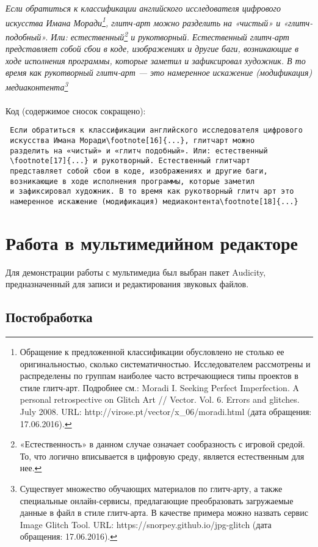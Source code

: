 \documentclass[a4paper]{article}
\begin{document}
\emph{Если обратиться к классификации английского исследователя цифрового искусства Имана Моради\footnote[16]{Обращение к предложенной классификации обусловлено не столько ее оригинальностью, сколько систематичностью. Исследователем рассмотрены и распределены по группам наиболее часто встречающиеся типы проектов в стиле глитч-арт. Подробнее см.: Moradi I. Seeking Perfect Imperfection. A personal retrospective on Glitch Art // Vector. Vol. 6. Errors and glitches. July 2008. URL: http://virose.pt/vector/x\_06/moradi.html (дата обращения: 17.06.2016).}, глитч-арт можно разделить на «чистый» и «глитч-подобный». Или: естественный\footnote[17]{«Естественность» в данном случае означает сообразность с игровой средой. То, что логично вписывается в цифровую среду, является естественным для нее.} и рукотворный. Естественный глитч-арт представляет собой сбои в коде, изображениях и другие баги, возникающие в ходе исполнения программы, которые заметил и зафиксировал художник. В то время как рукотворный глитч-арт — это намеренное искажение (модификация) медиаконтента\footnote[18]{Существует множество обучающих материалов по глитч-арту, а также специальные онлайн-сервисы, предлагающие преобразовать загружаемые данные в файл в стиле глитч-арта. В качестве примера можно назвать сервис Image Glitch Tool. URL: https://snorpey.github.io/jpg-glitch (дата обращения: 17.06.2016).} }\\\\
\hfill\break
Код (содержимое сносок сокращено):\\
\begin{lstlisting}
 Если обратиться к классификации английского исследователя цифрового 
 искусства Имана Моради\footnote[16]{...}, глитчарт можно 
 разделить на «чистый» и «глитч подобный». Или: естественный
 \footnote[17]{...} и рукотворный. Естественный глитчарт 
 представляет собой сбои в коде, изображениях и другие баги, 
 возникающие в ходе исполнения программы, которые заметил 
 и зафиксировал художник. В то время как рукотворный глитч арт это 
 намеренное искажение (модификация) медиаконтента\footnote[18]{...}
\end{lstlisting}
\thispagestyle{empty}

\newpage
\section{Работа в мультимедийном редакторе}
Для демонстрации работы с мультимедиа был выбран пакет Audicity, предназначенный для записи и редактирования звуковых файлов.
\subsection{Постобработка}
\end{document}
